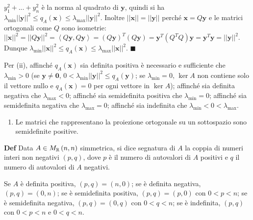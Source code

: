 \documentclass{article}
\begin{document}
$y_{1}^{2}+...+y_{n}^{2}$ \`{e} la norma al quadrato di $\mathbf{y}$, quindi
si ha $\lambda _{\min }\left\vert \left\vert \mathbf{y}\right\vert
\right\vert ^{2}\leq q_{A}\left( \mathbf{x}\right) \leq \lambda _{\max
}\left\vert \left\vert \mathbf{y}\right\vert \right\vert ^{2}$. Inoltre $%
\left\vert \left\vert \mathbf{x}\right\vert \right\vert =\left\vert
\left\vert \mathbf{y}\right\vert \right\vert $ perch\'{e} $\mathbf{x}=Q%
\mathbf{y}$ e le matrici ortogonali come $Q$ sono isometrie: $\left\vert
\left\vert \mathbf{x}\right\vert \right\vert ^{2}=\left\vert \left\vert Q%
\mathbf{y}\right\vert \right\vert ^{2}=\left\langle Q\mathbf{y},Q\mathbf{y}%
\right\rangle =\left( Q\mathbf{y}\right) ^{T}\left( Q\mathbf{y}\right) =%
\mathbf{y}^{T}\left( Q^{T}Q\right) \mathbf{y=y}^{T}\mathbf{y}=\left\vert
\left\vert \mathbf{y}\right\vert \right\vert ^{2}$. Dunque $\lambda _{\min
}\left\vert \left\vert \mathbf{x}\right\vert \right\vert ^{2}\leq
q_{A}\left( \mathbf{x}\right) \leq \lambda _{\max }\left\vert \left\vert 
\mathbf{x}\right\vert \right\vert ^{2}$. $\blacksquare $

Per (ii), affinch\'{e} $q_{A}\left( \mathbf{x}\right) $ sia definita
positiva \`{e} necessario e sufficiente che $\lambda _{\min }>0$ (se $%
\mathbf{y\neq 0}$, $0<\lambda _{\min }\left\vert \left\vert \mathbf{y}%
\right\vert \right\vert ^{2}\leq q_{A}\left( \mathbf{y}\right) $; se $%
\lambda _{\min }=0$, $\ker A$ non contiene solo il vettore nullo e $%
q_{A}\left( \mathbf{x}\right) =0$ per ogni vettore in $\ker A$); affinch\'{e}
sia definita negativa che $\lambda _{\max }<0$; affinch\'{e} sia
semidefinita positiva che $\lambda _{\min }=0$; affinch\'{e} sia
semidefinita negativa che $\lambda _{\max }=0$; affinch\'{e} sia indefinita
che $\lambda _{\min }<0<\lambda _{\max }$.

\begin{enumerate}
\item Le matrici che rappresentano la proiezione ortogonale su un
sottospazio sono semidefinite positive.
\end{enumerate}

\textbf{Def} Data $A\in M_{%
\mathbb{R}
}\left( n,n\right) $ simmetrica, si dice segnatura di $A$ la coppia di
numeri interi non negativi $\left( p,q\right) $, dove $p$ \`{e} il numero di
autovalori di $A$ positivi e $q$ il numero di autovalori di $A$ negativi.

Se $A$ \`{e} definita positiva, $\left( p,q\right) =\left( n,0\right) $; se 
\`{e} definita negativa, $\left( p,q\right) =\left( 0,n\right) $; se \`{e}
semidefinita positiva, $\left( p,q\right) =\left( p,0\right) $ con $0<p<n$;
se \`{e} semidefinita negativa, $\left( p,q\right) =\left( 0,q\right) $ con $%
0<q<n$; se \`{e} indefinita, $\left( p,q\right) $ con $0<p<n$ e $0<q<n$.
\end{document}
